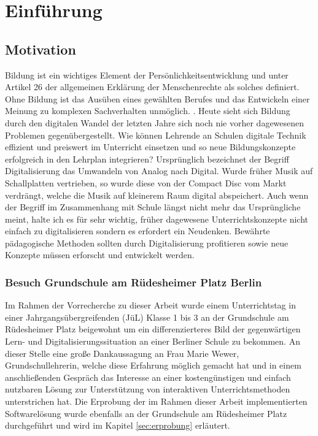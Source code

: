 \section{Einführung}\label{sec:einfuhrung}
\subsection{Motivation}\label{sec:motivation}

Bildung ist ein wichtiges Element der Persönlichkeitsentwicklung und unter Artikel 26 der allgemeinen Erklärung der Menschenrechte als solches definiert. Ohne Bildung ist das Ausüben eines gewählten Berufes und das Entwickeln einer Meinung zu komplexen Sachverhalten unmöglich. \cite{weitblicker.org2019:online}. Heute sieht sich Bildung durch den digitalen Wandel der letzten Jahre sich noch nie vorher dagewesenen Problemen gegenübergestellt. Wie können Lehrende an Schulen digitale Technik effizient und preiswert im Unterricht einsetzen und so neue Bildungskonzepte erfolgreich in den Lehrplan integrieren? Ursprünglich bezeichnet der Begriff Digitalisierung das Umwandeln von Analog nach Digital. Wurde früher Musik auf Schallplatten vertrieben, so wurde diese von der Compact Disc vom Markt verdrängt, welche die Musik auf kleinerem Raum digital abspeichert. Auch wenn der Begriff im Zusammenhang mit Schule längst nicht mehr das Ursprüngliche meint, halte ich es für sehr wichtig, früher dagewesene Unterrichtskonzepte nicht einfach zu digitalisieren sondern es erfordert ein Neudenken. Bewährte pädagogische Methoden sollten durch Digitalisierung profitieren sowie neue Konzepte müssen erforscht und entwickelt werden. 

\subsubsection{Besuch Grundschule am Rüdesheimer Platz Berlin}
Im Rahmen der Vorrecherche zu dieser Arbeit wurde einem Unterrichtstag in 
einer Jahrgangsübergreifenden (JüL) Klasse 1 bis 3 an der Grundschule am Rüdesheimer Platz beigewohnt um ein differenzierteres 
Bild der gegenwärtigen Lern- und Digitalisierungssituation an einer Berliner Schule zu bekommen. An dieser Stelle eine große Dankaussagung an Frau Marie Wewer, Grundschullehrerin, welche diese Erfahrung möglich gemacht hat und in einem anschließenden Gespräch das Interesse an einer kostengünstigen und einfach nutzbaren Lösung zur Unterstützung von interaktiven Unterrichtsmethoden unterstrichen hat. Die Erprobung der im Rahmen dieser Arbeit implementierten Softwarelösung wurde ebenfalls an der Grundschule am Rüdesheimer Platz durchgeführt und wird im Kapitel \ref{sec:erprobung} erläutert.  
\newpage
